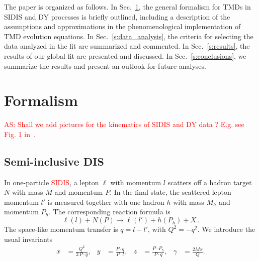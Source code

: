 \documentclass[aps,preprintnumbers,showpacs,nofootinbib,superscriptaddress,floatfix]{revtex4}
\begin{document}
The paper is organized as follows. In Sec.~\ref{s:theory}, the general
formalism for TMDs in SIDIS and DY processes is briefly outlined, including a
description of the assumptions and approximations in the phenomenological
implementation of TMD evolution equations. In Sec.~\ref{s:data_analysis}, the criteria
for selecting the data analyzed in the fit are summarized and commented. In
Sec.~\ref{s:results}, the results of our global fit are presented and
discussed. In Sec.~\ref{s:conclusions}, we summarize the results and present an outlook for future analyses. 
   

\section{Formalism}
\label{s:theory}

\textcolor{red}{AS: Shall we add pictures for the kinematics of SIDIS and DY data ? E.g. see Fig. 1 in~\cite{Signori:2013mda}.}

\subsection{Semi-inclusive DIS}
\label{ss:SIDIS_formalism}

In one-particle \textcolor{red}{SIDIS}, a lepton $\ell$ with momentum $l$ scatters 
off a hadron target $N$ with mass $M$ and momentum
$P$. In the final state, the scattered lepton momentum 
$l'$ is measured together with
one hadron $h$ with mass $M_h$
and momentum $P_h$. The corresponding reaction formula is  
\begin{equation}
  \label{e:sidis}
\ell(l) + N(P) \to \ell(l') + h(P_h) + X \, .
\end{equation}
The space-like momentum transfer is $q = l - l'$, with $Q^2 = - q^2$. We
introduce the usual invariants  
\begin{align}
  \label{e:xyz}
x &= \frac{Q^2}{2\,P\cdot q},
&
y &= \frac{P \cdot q}{P \cdot l},
&
z &= \frac{P \cdot P_h}{P\cdot q},
&
\gamma &= \frac{2 M x}{Q} .
\end{align}
\end{document}
